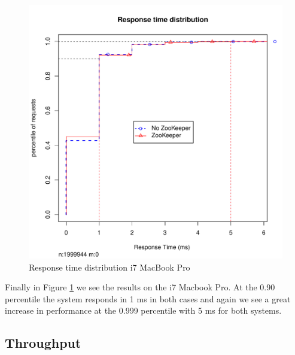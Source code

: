 \clearpage
\begin{figure}[h]
    \centering
    \includegraphics[width=1.0\textwidth]{results/distribution/distribution_eivind}
    \caption{Response time distribution i7 MacBook Pro}
    \label{fig:dist_eivind}
\end{figure}

Finally in Figure \ref{fig:dist_eivind} we see the results on the i7 Macbook Pro. At the 0.90 percentile the system responds in 1 ms in both cases and again we see a great increase in performance at the 0.999 percentile with 5 ms for both systems.

\subsection{Throughput}

